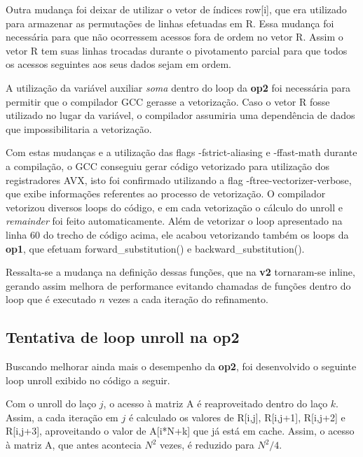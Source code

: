 \documentclass[12pt]{article}
\begin{document}
Outra mudança foi deixar de utilizar o vetor de índices row[i], que era utilizado para armazenar as permutações de linhas efetuadas em R. Essa mudança foi necessária para que não ocorressem acessos fora de ordem no vetor R. Assim o vetor R tem suas linhas trocadas durante o pivotamento parcial para que todos os acessos seguintes aos seus dados sejam em ordem.

A utilização da variável auxiliar \emph{soma} dentro do loop da \textbf{op2} foi necessária para permitir que o compilador GCC gerasse a vetorização. Caso o vetor R fosse utilizado no lugar da variável, o compilador assumiria uma dependência de dados que impossibilitaria a vetorização.

Com estas mudanças e a utilização das flags -fstrict-aliasing e -ffast-math durante a compilação, o GCC conseguiu gerar código vetorizado para utilização dos registradores AVX, isto foi confirmado utilizando a flag -ftree-vectorizer-verbose, que exibe informações referentes ao processo de vetorização. O compilador vetorizou diversos loops do código, e em cada vetorização o cálculo do unroll e \emph{remainder} foi feito automaticamente. Além de vetorizar o loop apresentado na linha 60 do trecho de código acima, ele acabou vetorizando também os loops da \textbf{op1}, que efetuam forward\_substitution() e backward\_substitution().

Ressalta-se a mudança na definição dessas funções, que na \textbf{v2} tornaram-se inline, gerando assim melhora de performance evitando chamadas de funções dentro do loop que é executado $n$ vezes a cada iteração do refinamento.

\subsection{Tentativa de loop unroll na op2}

Buscando melhorar ainda mais o desempenho da \textbf{op2}, foi desenvolvido o seguinte loop unroll exibido no código a seguir.

Com o unroll do laço $j$, o acesso à matriz A é reaproveitado dentro do laço $k$. Assim, a cada iteração em $j$ é calculado os valores de R[i,j], R[i,j+1], R[i,j+2] e R[i,j+3], aproveitando o valor de A[i*N+k] que já está em cache. Assim, o acesso à matriz A, que antes acontecia $N^2$ vezes, é reduzido para $N^2/4$.
\end{document}
